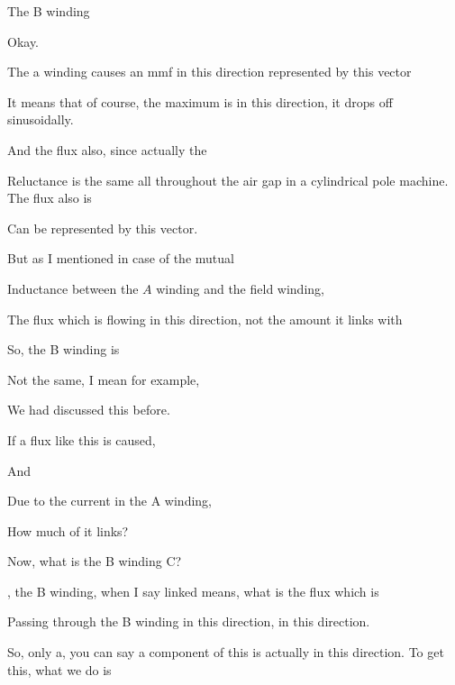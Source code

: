 \documentclass{article}
\begin{document}
The B winding



Okay.

The a winding causes an mmf in this direction represented by this vector

It means that of course, the maximum is in this direction, it drops off sinusoidally.

And the flux also, since actually the

Reluctance is the same all throughout the air gap in a cylindrical pole machine. The flux also is



Can be represented by this vector.

But as I mentioned in case of the mutual

Inductance between the $A$ winding and the field winding,

The flux which is flowing in this direction, not the amount it links with

So, the B winding is

Not the same, I mean for example,

We had discussed this before.

If a flux like this is caused,











And

Due to the current in the A winding,

How much of it links?

Now, what is the B winding C?

, the B winding, when I say linked means, what is the flux which is

Passing through the B winding in this direction, in this direction.

So, only a, you can say a component of this is actually in this direction. To get this, what we do is
\end{document}
